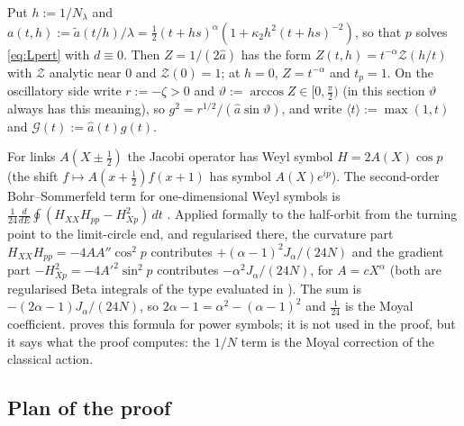 Put $h:=1/N_\lambda$ and $a(t,h):=\tilde a(t/h)/\lambda=\frac12(t+hs)^\alpha(1+\kappa_2h^2(t+hs)^{-2})$,
so that $p$ solves \eqref{eq:Lpert} with $d\equiv0$. Then $Z=1/(2\hat a)$ has the form
$Z(t,h)=t^{-\alpha}\mathcal Z(h/t)$ with $\mathcal Z$ analytic near $0$ and $\mathcal Z(0)=1$; at $h=0$,
$Z=t^{-\alpha}$ and $t_p=1$. On the oscillatory side write $r:=-\zeta>0$ and
$\vartheta:=\arccos Z\in[0,\frac\pi2)$ (in this section $\vartheta$ always has this meaning), so
$g^2=r^{1/2}/(\hat a\sin\vartheta)$, and write
$\langle t\rangle:=\max(1,t)$ and $\mathcal G(t):=\hat a(t)g(t)$.

\begin{remark}\label{rem:moyal}
For links $A(X\pm\frac12)$ the Jacobi operator has Weyl symbol $H=2A(X)\cos p$ (the shift
$f\mapsto A(x+\frac12)f(x+1)$ has symbol $A(X)e^{ip}$). The second-order Bohr--Sommerfeld
term for one-dimensional Weyl symbols is $\frac1{24}\frac{d}{dE}\oint(H_{XX}H_{pp}-H_{Xp}^2)\,dt$
\cite{ColinDeVerdiere2005}. Applied formally to the half-orbit from the turning point to the
limit-circle end, and regularised there, the curvature part
$H_{XX}H_{pp}=-4AA''\cos^2p$ contributes $+(\alpha-1)^2J_\alpha/(24N)$ and the gradient part
$-H_{Xp}^2=-4A'^2\sin^2p$ contributes $-\alpha^2J_\alpha/(24N)$, for $A=cX^\alpha$ (both are regularised Beta integrals of the
type evaluated in ). The sum is
$-(2\alpha-1)J_\alpha/(24N)$, so $2\alpha-1=\alpha^2-(\alpha-1)^2$ and $\frac1{24}$ is the Moyal coefficient.
 proves this formula for power symbols; it is not used in the proof, but it
says what the proof computes: the $1/N$ term is the Moyal correction of the classical action.
\end{remark}

\subsection{Plan of the proof}


